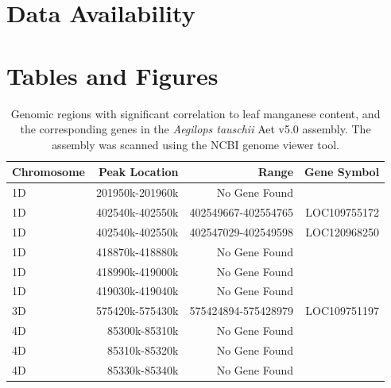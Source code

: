 \documentclass[12pt, letterpaper, ]{report}
\begin{document}
\section{Data Availability}

\printbibliography

\section{Tables and Figures}

\begin{table}[ht]
        \centering
        \caption{Genomic regions with significant correlation to leaf manganese content, and the corresponding genes in the \textit{Aegilops tauschii} Aet v5.0 assembly. The assembly was scanned using the NCBI genome viewer tool.}
        \label{tab:peaks_and_genes}
        \begin{tabular}{lrrr}
        \hline
        \textbf{Chromosome} & \textbf{Peak Location} & \textbf{Range} & \textbf{Gene Symbol} \\
        \hline
        1D         & 201950k-201960k   & No Gene Found          &                 \\
        1D         & 402540k-402550k   & 402549667-402554765    & LOC109755172    \\
        1D         & 402540k-402550k   & 402547029-402549598    & LOC120968250    \\
        1D         & 418870k-418880k   & No Gene Found          &                 \\
        1D         & 418990k-419000k   & No Gene Found          &                 \\
        1D         & 419030k-419040k   & No Gene Found          &                 \\
        3D         & 575420k-575430k   & 575424894-575428979    & LOC109751197    \\
        4D         & 85300k-85310k     & No Gene Found          &                 \\
        4D         & 85310k-85320k     & No Gene Found          &                 \\
        4D         & 85330k-85340k     & No Gene Found          &                 \\
        \hline
        \end{tabular}
\end{table}
        
\end{document}
